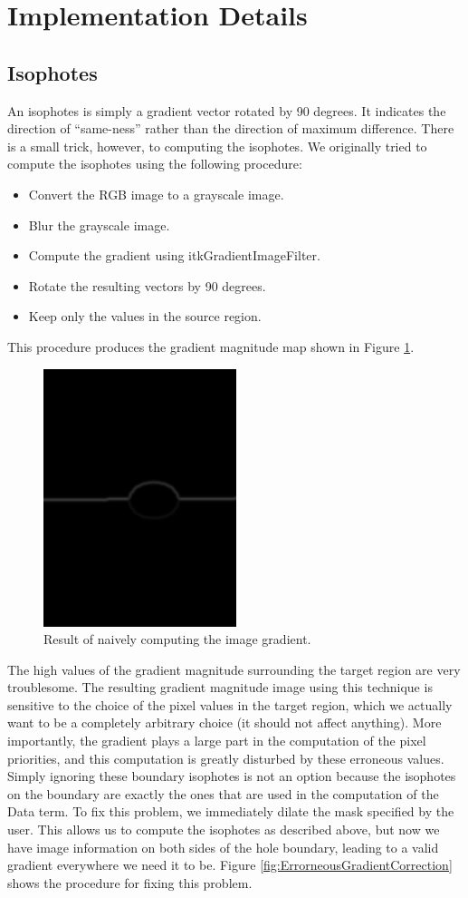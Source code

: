 \documentclass{InsightArticle}
\begin{document}
\section{Implementation Details}
\label{sec:ImplementationDetails}

\subsection{Isophotes}
An isophotes is simply a gradient vector rotated by 90 degrees. It indicates the direction of ``same-ness'' rather than the direction of maximum difference. There is a small trick, however, to computing the isophotes. We originally tried to compute the isophotes using the following procedure:

\begin{itemize}
 \item Convert the RGB image to a grayscale image.
 \item Blur the grayscale image.
 \item Compute the gradient using itkGradientImageFilter.
 \item Rotate the resulting vectors by 90 degrees.
 \item Keep only the values in the source region.
\end{itemize}

This procedure produces the gradient magnitude map shown in Figure \ref{fig:ErroneousGradient}.
\begin{figure}[H]
  \centering
  \includegraphics[width=0.3\linewidth]{images/ErroneousGradient}
  \caption{Result of naively computing the image gradient.}
  \label{fig:ErroneousGradient}
\end{figure}

The high values of the gradient magnitude surrounding the target region are very troublesome. The resulting gradient magnitude image using this technique is sensitive to the choice of the pixel values in the target region, which we actually want to be a completely arbitrary choice (it should not affect anything). More importantly, the gradient plays a large part in the computation of the pixel priorities, and this computation is greatly disturbed by these erroneous values. Simply ignoring these boundary isophotes is not an option because the isophotes on the boundary are exactly the ones that are used in the computation of the Data term. To fix this problem, we immediately dilate the mask specified by the user. This allows us to compute the isophotes as described above, but now we have image information on both sides of the hole boundary, leading to a valid gradient everywhere we need it to be. Figure \ref{fig:ErrorneousGradientCorrection} shows the procedure for fixing this problem.
\end{document}
